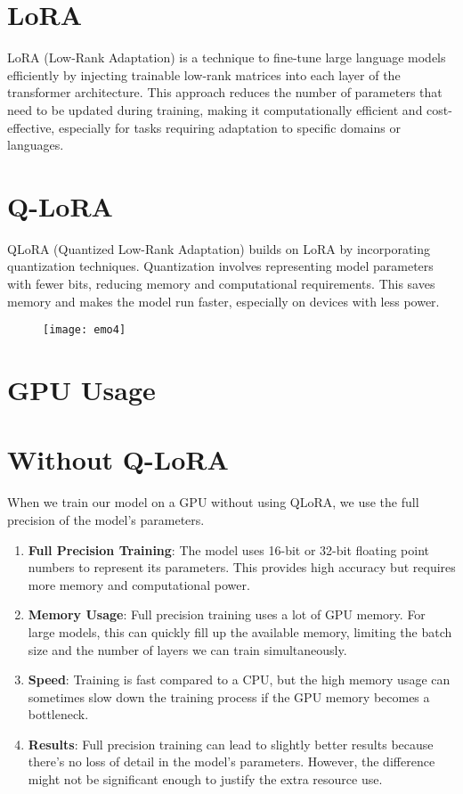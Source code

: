 \section{LoRA}
LoRA (Low-Rank Adaptation) is a technique to fine-tune large language models efficiently by injecting trainable low-rank matrices into each layer of the transformer architecture. This approach reduces the number of parameters that need to be updated during training, making it computationally efficient and cost-effective, especially for tasks requiring adaptation to specific domains or languages.

\section{Q-LoRA}
QLoRA (Quantized Low-Rank Adaptation) builds on LoRA by incorporating quantization techniques. Quantization involves representing model parameters with fewer bits, reducing memory and computational requirements. This saves memory and makes the model run faster, especially on devices with less power.

\begin{figure}[h]
\texttt{[image: emo4]}
\centering
\end{figure}
\section{GPU Usage}

\section{Without Q-LoRA}
When we train our model on a GPU without using QLoRA, we use the full precision of the model's parameters.
\begin{enumerate}
    \item \textbf{Full Precision Training}: The model uses 16-bit or 32-bit floating point numbers to represent its parameters. This provides high accuracy but requires more memory and computational power.
    \item \textbf{Memory Usage}: Full precision training uses a lot of GPU memory. For large models, this can quickly fill up the available memory, limiting the batch size and the number of layers we can train simultaneously.
    \item \textbf{Speed}: Training is fast compared to a CPU, but the high memory usage can sometimes slow down the training process if the GPU memory becomes a bottleneck.
    \item \textbf{Results}: Full precision training can lead to slightly better results because there’s no loss of detail in the model’s parameters. However, the difference might not be significant enough to justify the extra resource use.
\end{enumerate}

